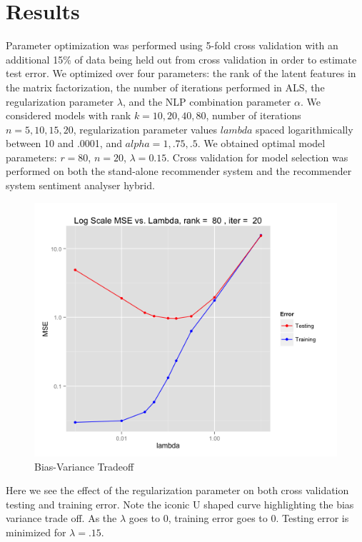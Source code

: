\documentclass{article} %
\begin{document}
\section{Results}
Parameter optimization was performed using 5-fold cross validation with an additional 15\% of data being held out from cross validation in order to estimate test error. We optimized over four parameters: the rank of the latent features in the matrix factorization, the number of iterations performed in ALS, the regularization parameter $\lambda$, and the NLP combination parameter $\alpha.$ We considered models with rank $k=10,20,40,80$, number of iterations $n=5, 10, 15, 20$, regularization parameter values $lambda$ spaced logarithmically between 10 and .0001, and $alpha = 1, .75, .5$. We obtained optimal model parameters: $r=80$, $n=20$, $\lambda=0.15$. Cross validation for model selection was performed on both the stand-alone recommender system and the recommender system sentiment analyser hybrid. 

\begin{figure}[H]
  \centering
    \includegraphics[scale=0.5]{effect_lambda}
     \caption{Bias-Variance Tradeoff}
\end{figure}

Here we see the effect of the regularization parameter on both cross validation testing and training error. Note the iconic U shaped curve highlighting the bias variance trade off. As the $\lambda$ goes to 0, training error goes to 0. Testing error is minimized for $\lambda = .15$.
\end{document}
